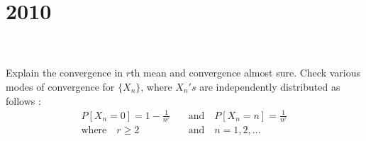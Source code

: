 \section*{2010}
\vspace{-.5cm}
\hrulefill \\\\
 Explain the convergence in $r$th mean and convergence almost sure. Check various modes of convergence for $\{X_n\}$, where $X_n 's$ are independently distributed as follows :
\begin{equation*}
\begin{aligned}
    P[X_n = 0] = 1 - \frac{1}{n^r} \quad &\text{and} \quad P[X_n = n] = \frac{1}{n^r}\\
    \text{where} \quad r\geq 2 \quad &\text{and}  \quad n=1,2,\dots
\end{aligned}
\end{equation*}
